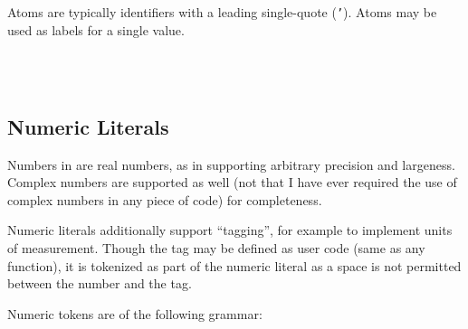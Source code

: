 Atoms are typically identifiers with a leading single-quote (\texttt{'}).
Atoms may be used as labels for a single value.

\begin{bnf*}
     \\
     \\
\end{bnf*}

\subsection{Numeric Literals}

Numbers in \Trilogy{} are real numbers, as in supporting arbitrary
precision and largeness. Complex numbers are supported as well
(not that I have ever required the use of complex numbers in any
piece of code) for completeness.

Numeric literals additionally support ``tagging'', for example to implement
units of measurement. Though the tag may be defined as user code (same as any
function), it is tokenized as part of the numeric literal as a space is not
permitted between the number and the tag.

Numeric tokens are of the following grammar:

\begin{bnf*}
     \\
     \\
     \\
     \\
     \\
     \\
     \\
     \\
     \\
\end{bnf*}

